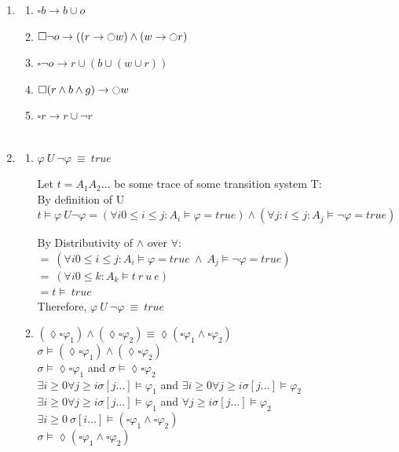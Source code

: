\documentclass[a4paper,12pt]{article}
\begin{document}
\begin{enumerate}
\begin{enumerate}
			\end{enumerate}
		\item \begin{enumerate}
			\item $\square b \rightarrow b \cup o$
			\item $\square \neg o \rightarrow ((r \rightarrow \ocircle w) \wedge (w \rightarrow \ocircle r)$
			\item $\square \neg o \rightarrow r \cup (b \cup (w \cup r))$
			\item $\square (r \wedge b \wedge g) \rightarrow \ocircle w$
			\item $\square r \rightarrow r \cup \neg r$\\\\
		\end{enumerate}
		\item \begin{enumerate}
			\item 	$\varphi\ U\ \lnot\varphi\ \equiv\ true$
			
			Let $t=A_1A_2\ldots$ be some trace of some transition system T:\\
			
			By definition of U\\
			$t \models\varphi\ U\lnot\varphi=\left(\forall i 0\le i\le j:A_i\models\varphi=true\right)\land\left(\forall j:i\le j:A_j\models\lnot\varphi=true\right)$
			
			By Distributivity of $\land$ over $\forall:$\\
			$=\ \left(\forall i 0\le i\le j:A_i\models\varphi=true\ \land\ A_j\models\lnot\varphi=true\right)$\\
			$=\ \left(\forall i 0\le k:A_k\models t\ r\ u\ e\right)$\\
			$= t \models\ true$\\
			
			Therefore, $\varphi\ U\ \lnot\varphi\ \equiv\ true$
			
			\item $(\lozenge\square\varphi_1)\wedge(\lozenge\square\varphi_2)\equiv\lozenge(\square\varphi_1\wedge\square\varphi_2)$\\
			
			$\sigma\models(\lozenge\square\varphi_1)\wedge(\lozenge\square\varphi_2)$\\
			$\sigma\models\lozenge\square\varphi_1$ and $\sigma\models\lozenge\square\varphi_2$\\
			$\exists i\geq 0 \forall j\geq i \sigma[j\ldots]\models\varphi_1$ and $\exists i\geq 0 \forall j\geq i \sigma[j\ldots]\models\varphi_2$\\
			$\exists i\geq 0 \forall j\geq i \sigma[j\ldots]\models\varphi_1$ and $\forall j\geq i \sigma[j\ldots]\models\varphi_2$\\
			$\exists i\geq 0 ~\sigma[i\ldots]\models(\square\varphi_1\wedge\square\varphi_2)$\\
			$\sigma\models\lozenge(\square\varphi_1\wedge\square\varphi_2)$\\
			

\end{enumerate}
\end{enumerate}
\end{document}
